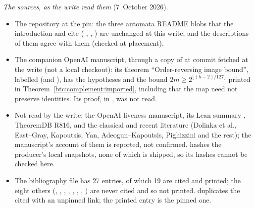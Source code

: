 \begin{writenote}
\emph{The sources, as the write read them} (7~October 2026).
\begin{itemize}\raggedright
\item The repository at the pin: the three automata README blobs that the
 introduction and  cite
 ( ,
  ,
  ) are unchanged at this
 write, and the descriptions of them agree with them (checked at
 placement).
\item The companion OpenAI manuscript, through a copy of
  at commit  fetched at the write
 (not a local checkout): its theorem ``Order-reversing image bound'',
 labelled  (and ), has the
 hypotheses and the bound $2m\ge2^{\lfloor(h-2)/127\rfloor}$ printed in
 Theorem~\ref{btc:complement:imported}, including that the map need not
 preserve identities. Its proof, in , was
 not read.
\item Not read by the write: the OpenAI liveness manuscript, its Lean summary
 , TheoremDB R816, and the classical and recent
 literature (Dolinka et al., East--Gray, Kapoutsis, Yan, Adeogun--Kapoutsis,
 Pighizzini and the rest); the manuscript's account of them is reported,
 not confirmed.  hashes the producer's local
 snapshots, none of which is shipped, so its hashes cannot be checked here.
\item The bibliography file has 27 entries, of which 19 are cited and
 printed; the eight others (,
 , , ,
 , ,
 , ) are never
 cited and so not printed.  duplicates the
 cited  with an unpinned  link;
 the printed entry is the pinned one.
\end{itemize}


\end{writenote}
